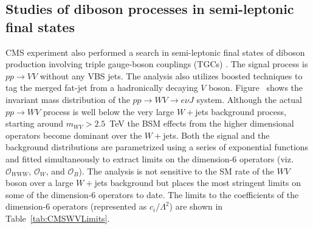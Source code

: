 \subsection{Studies of diboson processes in semi-leptonic final states}
\label{sec:CMSWV}

\begin{figure}[htb]
\centering
\caption{}
\label{fig:BSMTails}
\end{figure}

CMS experiment also performed a search in semi-leptonic final states of diboson production involving triple gauge-boson couplings (TGCs) \cite{Sirunyan:2019gkh}.
The signal process is $pp\to VV$ without any VBS jets.
The analysis also utilizes boosted techniques to tag the merged fat-jet from a hadronically decaying $V$ boson.
Figure~ shows the invariant mass distribution of the $pp\to WV\to e\nu J$ system.
Although the actual $pp\to WV$ process is well below the very large $W+$jets background process, starting around $m_{WV} > 2.5$~TeV the BSM effects from the higher dimensional operators become dominant over the $W+$jets.
Both the signal and the background distributions are parametrized using a series of exponential functions and fitted simultaneously to extract limits on the dimension-6 operators (viz. $\mathcal{O}_{WWW}$, $\mathcal{O}_{W}$, and $\mathcal{O}_{B}$).
The analysis is not sensitive to the SM rate of the $WV$ boson over a large $W+$jets background but places the most stringent limits on some of the dimension-6 operators to date.
The limits to the coefficients of the dimension-6 operators (represented as $c_{i} / \Lambda^2$) are shown in Table~\ref{tab:CMSWVLimits}.

